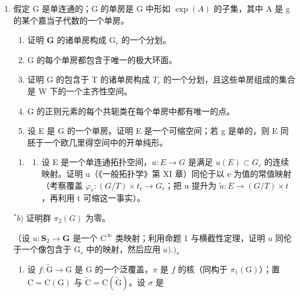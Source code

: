 
\begin{enumerate}
\def\labelenumi{\arabic{enumi})}
\item
  假定 G 是单连通的；G 的单房是 G 中形如 \(\exp(A)\) 的子集，其中 A 是 g 的某个嘉当子代数的一个单房。

\begin{enumerate}
\def\labelenumi{\alph{enumi})}
\item
  证明 \(\mathbf{G}\) 的诸单房构成 \(\mathrm{G}_r\) 的一个分划。
\item
  G 的每个单房都包含于唯一的极大环面。
\item
  证明 G 的包含于 T 的诸单房构成 \(T_{r}\) 的一个分划，且这些单房组成的集合是 W 下的一个主齐性空间。
\item
  G 的正则元素的每个共轭类在每个单房中都有唯一的点。
\item
  设 E 是 G 的一个单房。证明 E 是一个可缩空间；若 g 是单的，则 E 同胚于一个欧几里得空间中的开单纯形。
\end{enumerate}

\begin{enumerate}
\def\labelenumi{\arabic{enumi})}
\setcounter{enumi}{1}
\tightlist
\item
  \begin{enumerate}
  \def\labelenumii{\alph{enumii})}
  \tightlist
  \item
    设 E 是一个单连通拓扑空间，\(u : E \to G\) 是满足 \(u(E) \subset G_r\) 的连续映射。证明 u（《一般拓扑学》第 XI 章）同伦于以 e 为值的常值映射（考察覆盖 \(\varphi_r : (G/T) \times t_r \to G_r\)；把 u 提升为 \(\tilde{u} : E \to (G/T) \times t\)，再利用 t 可缩这一事实）。
  \end{enumerate}
\end{enumerate}

\(^{*}b)\) 证明群 \(\pi_{2}(G)\) 为零。

（设 \(u: \mathbf{S}_2 \to \mathbf{G}\) 是一个 \(\mathrm{C}^\infty\) 类映射；利用命题 1 与横截性定理，证明 \(u\) 同伦于一个像包含于 \(\mathrm{G}_r\) 中的映射，然后应用 \(a).)_*\)

\begin{enumerate}
\def\labelenumi{\arabic{enumi})}
\setcounter{enumi}{2}
\tightlist
\item
  设 \(f: \tilde{\mathrm{G}} \to \mathrm{G}\) 是 \(\mathrm{G}\) 的一个泛覆盖，\(\pi\) 是 \(f\) 的核（同构于 \(\pi_1(\mathrm{G})\)）；置 \(\mathrm{C} = \mathrm{C}(\mathrm{G})\) 与 \(\tilde{\mathrm{C}} = \mathrm{C}(\tilde{\mathrm{G}})\)。设 \(\sigma\) 是
\end{enumerate}


\end{enumerate}
